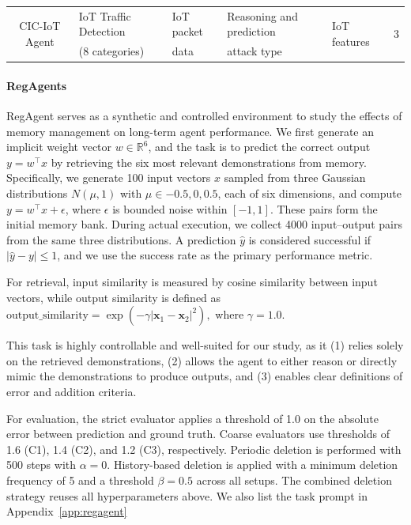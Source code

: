 \documentclass[11pt]{article}
\theoremstyle{plain}
\theoremstyle{definition}
\begin{document}
{\begin{table}[t!]
{\begin{tabular}{c|p{2.8cm}|p{1.8cm}|p{3.2cm}|p{2.2cm}|c}
\multirow{2}{*}{CIC-IoT Agent} & IoT Traffic Detection  & IoT packet & Reasoning and prediction & \multirow{2}{*}{IoT features} & \multirow{2}{*}{3} \\ 
& (8 categories) & data & attack type &  &  \\\bottomrule
\end{tabular}
}
\label{tab:agent_table}
\end{table}

\paragraph{RegAgents}
RegAgent serves as a synthetic and controlled environment to study the effects of memory management on long-term agent performance.
We first generate an implicit weight vector $w \in \mathbb{R}^6$, and the task is to predict the correct output $y = w^{\top}x$ by retrieving the six most relevant demonstrations from memory.
Specifically, we generate 100 input vectors $x$ sampled from three Gaussian distributions $N(\mu, 1)$ with $\mu \in {-0.5, 0, 0.5}$, each of six dimensions, and compute $y = w^{\top}x + \epsilon$, where $\epsilon$ is bounded noise within $[-1, 1]$. These pairs form the initial memory bank.
During actual execution, we collect 4000 input–output pairs from the same three distributions. A prediction $\hat{y}$ is considered successful if $|\hat{y} - y| \le 1$, and we use the success rate as the primary performance metric.

For retrieval, input similarity is measured by cosine similarity between input vectors, while output similarity is defined as
\(
\text{output\_similarity} = \exp(-\gamma |\mathbf{x}_1 - \mathbf{x}_2|^2),
\)
where $\gamma = 1.0$.

This task is highly controllable and well-suited for our study, as it (1) relies solely on the retrieved demonstrations, (2) allows the agent to either reason or directly mimic the demonstrations to produce outputs, and (3) enables clear definitions of error and addition criteria.

For evaluation, the strict evaluator applies a threshold of 1.0 on the absolute error between prediction and ground truth. Coarse evaluators use thresholds of 1.6 (C1), 1.4 (C2), and 1.2 (C3), respectively.
Periodic deletion is performed with 500 steps with $\alpha = 0$. History-based deletion is applied with a minimum deletion frequency of 5 and a threshold $\beta = 0.5$ across all setups. The combined deletion strategy reuses all hyperparameters above.
We also list the task prompt in Appendix~\ref{app:regagent}
}
\end{document}
